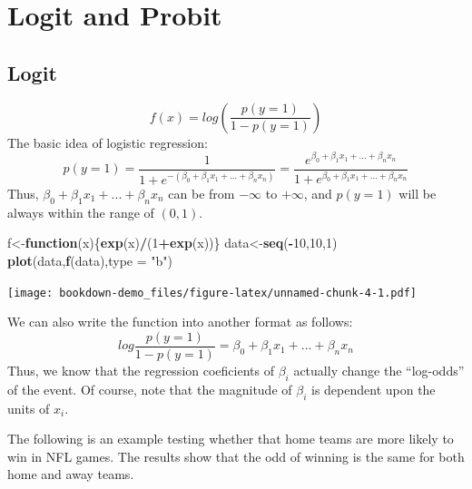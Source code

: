 \documentclass[]{book}
\newenvironment{Shaded}{\begin{snugshade}}{\end{snugshade}}
\newcommand{\ControlFlowTok}[1]{\textcolor[rgb]{0.13,0.29,0.53}{\textbf{#1}}}
\newcommand{\DataTypeTok}[1]{\textcolor[rgb]{0.13,0.29,0.53}{#1}}
\newcommand{\DecValTok}[1]{\textcolor[rgb]{0.00,0.00,0.81}{#1}}
\newcommand{\KeywordTok}[1]{\textcolor[rgb]{0.13,0.29,0.53}{\textbf{#1}}}
\newcommand{\NormalTok}[1]{#1}
\newcommand{\OperatorTok}[1]{\textcolor[rgb]{0.81,0.36,0.00}{\textbf{#1}}}
\newcommand{\StringTok}[1]{\textcolor[rgb]{0.31,0.60,0.02}{#1}}
\begin{document}
\hypertarget{logit-and-probit}{%
\chapter{Logit and Probit}\label{logit-and-probit}}

\hypertarget{logit}{%
\section{Logit}\label{logit}}

\[f(x)=log(\frac{p(y=1)}{1-p(y=1)})\]
The basic idea of logistic regression:
\[p(y=1)=\frac{1}{1+e^{-(\beta_0+\beta_1x_1+...+\beta_nx_n)}}=\frac{e^{\beta_0+\beta_1x_1+...+\beta_nx_n}}{1+e^{\beta_0+\beta_1x_1+...+\beta_nx_n}}\]
Thus, \(\beta_0+\beta_1x_1+...+\beta_nx_n\) can be from \(-\infty\) to \(+\infty\), and \(p(y=1)\) will be always within the range of \((0,1)\).

\begin{Shaded}
\begin{Highlighting}[]
\NormalTok{f<-}\ControlFlowTok{function}\NormalTok{(x)\{}\KeywordTok{exp}\NormalTok{(x)}\OperatorTok{/}\NormalTok{(}\DecValTok{1}\OperatorTok{+}\KeywordTok{exp}\NormalTok{(x))\}}
\NormalTok{data<-}\KeywordTok{seq}\NormalTok{(}\OperatorTok{-}\DecValTok{10}\NormalTok{,}\DecValTok{10}\NormalTok{,}\DecValTok{1}\NormalTok{)}
\KeywordTok{plot}\NormalTok{(data,}\KeywordTok{f}\NormalTok{(data),}\DataTypeTok{type =} \StringTok{"b"}\NormalTok{)}
\end{Highlighting}
\end{Shaded}

\texttt{[image: bookdown-demo\_files/figure-latex/unnamed-chunk-4-1.pdf]}

We can also write the function into another format as follows:
\[log \frac{p(y=1)}{1-p(y=1)}= \beta_0+\beta_1x_1+...+\beta_nx_n\]
Thus, we know that the regression coeficients of \(\beta_i\) actually change the ``log-odds'' of the event. Of course, note that the magnitude of \(\beta_i\) is dependent upon the units of \(x_i\).

The following is an example testing whether that home teams are more likely to win in NFL games. The results show that the odd of winning is the same for both home and away teams.

\begin{Shaded}
\end{Shaded}
\end{document}
